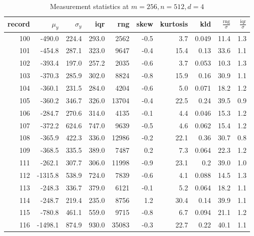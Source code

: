 \begin{table}[ht]
\tiny
\centering
\caption{Measurement statistics at $m=256,n=512,d=4$}
\begin{tabular}{rrrrrrrrrr}
\toprule
 record &  $\mu_y$ &  $\sigma_y$ &  iqr &  rng &  skew &  kurtosis 
 & kld & $\frac{\text{rng}}{\sigma}$ &  $\frac{\text{iqr}}{\sigma}$ \\
\midrule
100 &  -490.0 &  224.4 &  293.0 &     2562 &    -0.5 &         3.7 & 0.049 &       11.4 &        1.3 \\
101 &  -454.8 &  287.1 &  323.0 &     9647 &    -0.4 &        15.4 &  0.13 &       33.6 &        1.1 \\
102 &  -393.4 &  197.0 &  257.2 &     2035 &    -0.6 &         3.7 & 0.053 &       10.3 &        1.3 \\
103 &  -370.3 &  285.9 &  302.0 &     8824 &    -0.8 &        15.9 &  0.16 &       30.9 &        1.1 \\
104 &  -360.1 &  231.5 &  284.0 &     4204 &    -0.6 &         5.0 & 0.071 &       18.2 &        1.2 \\
105 &  -360.2 &  346.7 &  326.0 &    13704 &    -0.4 &        22.5 &  0.24 &       39.5 &        0.9 \\
106 &  -284.7 &  270.6 &  314.0 &     4135 &    -0.1 &         4.4 & 0.046 &       15.3 &        1.2 \\
107 &  -372.2 &  624.6 &  747.0 &     9639 &    -0.5 &         4.6 & 0.062 &       15.4 &        1.2 \\
108 &  -365.9 &  422.3 &  336.0 &    12986 &    -0.2 &        22.1 &  0.36 &       30.7 &        0.8 \\
109 &  -368.5 &  335.5 &  389.0 &     7487 &     0.2 &         7.3 & 0.064 &       22.3 &        1.2 \\
111 &  -262.1 &  307.7 &  306.0 &    11998 &    -0.9 &        23.1 &   0.2 &       39.0 &        1.0 \\
112 & -1315.8 &  538.9 &  724.0 &     7839 &    -0.6 &         4.1 & 0.088 &       14.5 &        1.3 \\
113 &  -248.3 &  336.7 &  379.0 &     6121 &    -0.1 &         5.2 & 0.064 &       18.2 &        1.1 \\
114 &  -248.7 &  219.4 &  235.0 &     8756 &     1.2 &        30.4 &  0.14 &       39.9 &        1.1 \\
115 &  -780.8 &  461.1 &  559.0 &     9715 &    -0.8 &         6.7 & 0.094 &       21.1 &        1.2 \\
116 & -1498.1 &  874.9 &  930.0 &    35083 &    -0.3 &        22.7 &  0.22 &       40.1 &        1.1 \\

\end{tabular}
\end{table}
